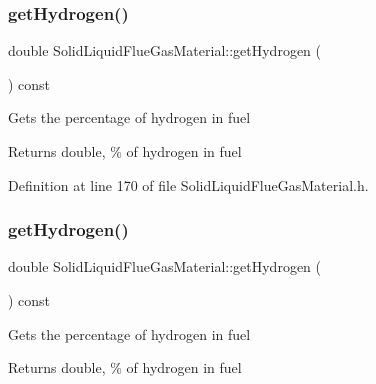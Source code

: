 \mbox{\label{class_solid_liquid_flue_gas_material_a26af2edd53c50b071648d03bc6442fb6}} 
\subsubsection{\texorpdfstring{get\+Hydrogen()}{getHydrogen()}\hspace{0.1cm}{\footnotesize\ttfamily [1/3]}}
{\footnotesize\ttfamily double Solid\+Liquid\+Flue\+Gas\+Material\+::get\+Hydrogen (\begin{DoxyParamCaption}{ }\end{DoxyParamCaption}) const\hspace{0.3cm}{\ttfamily [inline]}}

Gets the percentage of hydrogen in fuel \begin{DoxyReturn}{Returns}
double, \% of hydrogen in fuel 
\end{DoxyReturn}


Definition at line 170 of file Solid\+Liquid\+Flue\+Gas\+Material.\+h.

\mbox{\label{class_solid_liquid_flue_gas_material_a26af2edd53c50b071648d03bc6442fb6}} 
\subsubsection{\texorpdfstring{get\+Hydrogen()}{getHydrogen()}\hspace{0.1cm}{\footnotesize\ttfamily [2/3]}}
{\footnotesize\ttfamily double Solid\+Liquid\+Flue\+Gas\+Material\+::get\+Hydrogen (\begin{DoxyParamCaption}{ }\end{DoxyParamCaption}) const\hspace{0.3cm}{\ttfamily [inline]}}

Gets the percentage of hydrogen in fuel \begin{DoxyReturn}{Returns}
double, \% of hydrogen in fuel 
\end{DoxyReturn}


